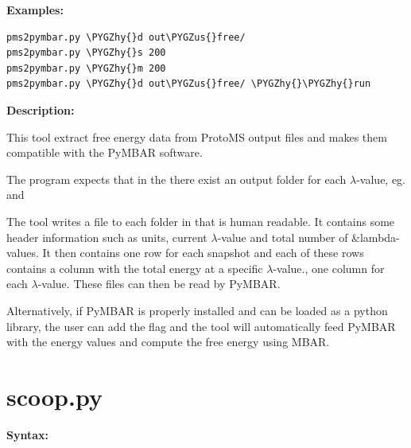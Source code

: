 \documentclass[letterpaper,10pt,english]{sphinxmanual}
\def\PYGZus{\char`\_}
\def\PYGZhy{\char`\-}
\begin{document}
\textbf{Examples:}

\begin{Verbatim}[frame=single,commandchars=\\\{\}]
pms2pymbar.py \PYGZhy{}d out\PYGZus{}free/
pms2pymbar.py \PYGZhy{}s 200
pms2pymbar.py \PYGZhy{}m 200
pms2pymbar.py \PYGZhy{}d out\PYGZus{}free/ \PYGZhy{}\PYGZhy{}run
\end{Verbatim}

\textbf{Description:}

This tool extract free energy data from ProtoMS output files and makes them compatible with the PyMBAR software.

The program expects that in the  there exist an output folder for each \(\lambda\)-value, eg.  and 

The tool writes a file  to each folder in  that is human readable. It contains some header information such as units, current \(\lambda\)-value and total number of \&lambda-values. It then contains one row for each snapshot and each of these rows contains a column with the total energy at a specific \(\lambda\)-value., one column for each \(\lambda\)-value. These files can then be read by PyMBAR.

Alternatively, if PyMBAR is properly installed and can be loaded as a python library, the user can add the  flag and the tool will automatically feed PyMBAR with the energy values and compute the free energy using MBAR.


\section{scoop.py}
\label{tools:scoop-py}
\textbf{Syntax:}
\end{document}
